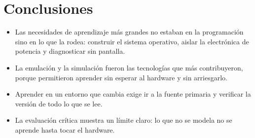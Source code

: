 \documentclass[11pt,a4paper]{article}
\begin{document}
\section{Conclusiones}

\begin{itemize}
  \item Las necesidades de aprendizaje más grandes no estaban en la
        programación sino en lo que la rodea: construir el sistema
        operativo, aislar la electrónica de potencia y diagnosticar sin
        pantalla.
  \item La emulación y la simulación fueron las tecnologías que más
        contribuyeron, porque permitieron aprender sin esperar al hardware y
        sin arriesgarlo.
  \item Aprender en un entorno que cambia exige ir a la fuente primaria y
        verificar la versión de todo lo que se lee.
  \item La evaluación crítica muestra un límite claro: lo que no se modela
        no se aprende hasta tocar el hardware.
\end{itemize}
\end{document}
